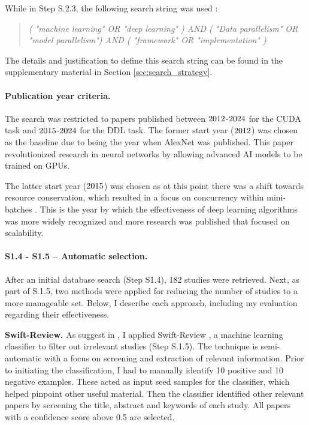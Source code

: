 While in Step S.2.3, the following search string was used :
\begin{quote}
	\textit{( "machine learning" OR "deep learning" )
		AND
		( "Data parallelism" OR "model parallelism")
		AND
		( "framework" OR "implementation" )}
\end{quote}

The details and justification to define this search string can be found in the supplementary
material in Section \ref{sec:search_strategy}.

\paragraph{Publication year criteria.}
The search was restricted to papers published between $2012$-$2024$ for the CUDA
task and $2015$-$2024$ for the DDL task. The former start year ($2012$)
was chosen as the baseline due to being the year when AlexNet \cite{krizhevsky_imagenet_2012} was
published. This paper revolutionized research in neural networks by allowing advanced AI models to
be trained on GPUs.

The latter start year ($2015$) was chosen as at this point there was a shift towards
resource conservation, which resulted in a focus on concurrency within mini-batches
\cite{ben-nun_demystifying_2020}. This is the year by which the effectiveness of deep learning
algorithms was more widely recognized and more research was published that focused on scalability.

\paragraph{S1.4 - S1.5 -- Automatic selection.}
After an initial database search (Step S1.4), 182 studies were retrieved. Next, as part of S.1.5,
two methods were applied for reducing the number of studies to a more manageable set. Below, I
describe each approach, including my evaluation regarding their effectiveness.

\textbf{Swift-Review.}
As suggest in \cite{bolanos_artificial_2024},
I applied Swift-Review \cite{Howard2016SWIFTReviewAT}, a machine learning classifier to filter out
irrelevant studies (Step S.1.5). The technique is semi-automatic
with a focus on screening and extraction of relevant information. Prior to initiating the classification,
I had to manually identify 10 positive and 10 negative examples. These
acted as input seed samples for the classifier, which helped pinpoint other useful material. Then
the classifier identified other relevant papers by screening the title, abstract and keywords of
each study. All papers with a confidence score above 0.5 are selected.

